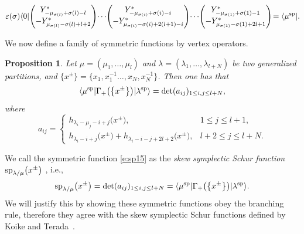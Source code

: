 \documentclass[pdftex]{sigma}
\numberwithin{equation}{section}
\newtheorem{Proposition}[Theorem]{Proposition}
 { \theoremstyle{definition}
\newtheorem{Definition}[Theorem]{Definition}
\newtheorem{Note}[Theorem]{Note}
\newtheorem{Example}[Theorem]{Example}
\newtheorem{Remark}[Theorem]{Remark} }
\begin{document}
\begin{align}\label{e:sp9}
\varepsilon(\sigma)\langle 0|\!\begin{pmatrix}{Y^*_{-\mu_{\sigma(l)}+\sigma(l)-l}}\\{-Y^*_{\mu_{\sigma(l)}-\sigma(l)+l+2}}\end{pmatrix}\!\cdots \! \begin{pmatrix}{Y^*_{-\mu_{\sigma(i)}+\sigma(i)-i}}\\{-Y^*_{\mu_{\sigma(i)}-\sigma(i)+2(l+1)-i}}\end{pmatrix}\!\cdots \! \begin{pmatrix}{Y^*_{-\mu_{\sigma(1)}+\sigma(1)-1}}\\{-Y^*_{\mu_{\sigma(1)}-\sigma(1)+2l+1}}\end{pmatrix}\!=\langle\mu^{\rm sp}|.\!
\end{align}

We now define a family of symmetric functions by vertex operators.
\begin{Proposition}\label{pro3}
Let $\mu=(\mu_1,\dots,\mu_l)$ and $\lambda=(\lambda_1,\dots,\lambda_{l+N})$ be two generalized partitions, and $\big\{x^{\pm}\big\}=\big\{x_1, x_1^{-1} \ldots, x_N, x_N^{-1}\big\}$. Then %
one has that
\begin{align}\label{e:sp15}
\langle\mu^{\rm sp}|\Gamma_+\big(\big\{x^{\pm}\big\}\big)|\lambda^{\rm sp}\rangle=\det(a_{ij})_{1\leq i,j\leq l+N},%
\end{align}
where
\begin{equation}\label{e:eq6}
a_{ij}=\begin{cases}
h_{\lambda_i-\mu_j-i+j}\big(x^{\pm}\big), & 1\leq j\leq l+1,\\
h_{\lambda_i-i+j}\big(x^{\pm}\big)+h_{\lambda_i-i-j+2l+2}\big(x^{\pm}\big), & l+2\leq j\leq l+N.
\end{cases}
\end{equation}
\end{Proposition}

We call the symmetric function \eqref{e:sp15} as the {\it skew symplectic Schur function} $ {\rm sp}_{\lambda/\mu}\big(x^{\pm}\big)$ , i.e.,
\begin{align}\label{e:sp21}
{\rm sp}_{\lambda/\mu}\big(x^{\pm}\big)=\det(a_{ij})_{1\leq i,j\leq l+N}=\langle\mu^{\rm sp}|\Gamma_+\big(\big\{x^{\pm}\big\}\big)|\lambda^{\rm sp}\rangle.
\end{align}
We will justify this by showing these symmetric functions obey the branching rule, therefore they agree with the skew symplectic Schur functions defined by Koike and Terada~\cite{KT1990}.
\end{document}
